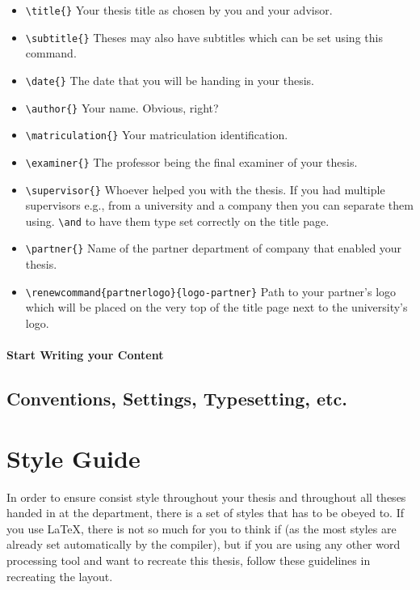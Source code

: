 \begin{itemize}
    \item \texttt{\textbackslash title\{\}} Your thesis title as chosen by you and your advisor.
    \item \texttt{\textbackslash subtitle\{\}} Theses may also have subtitles which can be set using this command.
    \item \texttt{\textbackslash date\{\}} The date that you will be handing in your thesis.
    \item \texttt{\textbackslash author\{\}} Your name. Obvious, right?
    \item \texttt{\textbackslash matriculation\{\}} Your matriculation identification.
    \item \texttt{\textbackslash examiner\{\}} The professor being the final examiner of your thesis.
    \item \texttt{\textbackslash supervisor\{\}} Whoever helped you with the thesis. If you had multiple supervisors e.g., from a university and a company then you can separate them using. \texttt{\textbackslash and} to have them type set correctly on the title page.
    \item \texttt{\textbackslash partner\{\}} Name of the partner department of company that enabled your thesis.
    \item \texttt{\textbackslash renewcommand\{partnerlogo\}\{logo-partner\}} Path to your partner's logo which will be placed on the very top of the title page next to the university's logo.
\end{itemize}


\subsubsection{Start Writing your Content}\label{sec:user-documentation:writing}


\section{Conventions, Settings, Typesetting, etc.}\label{sec:user-documentation:settings}



\chapter{Style Guide}\label{cha:style-guide}

In order to ensure consist style throughout your thesis and throughout all theses handed in at the department, there is a set of styles that has to be obeyed to.
If you use \LaTeX, there is not so much for you to think if (as the most styles are already set automatically by the compiler), but if you are using any other word processing tool and want to recreate this thesis, follow these guidelines in recreating the layout.


